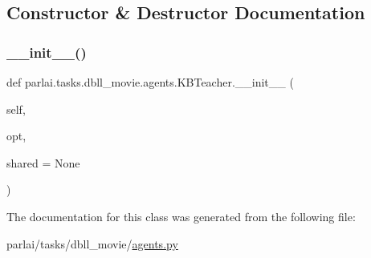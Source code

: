 \subsection{Constructor \& Destructor Documentation}
\mbox{\label{classparlai_1_1tasks_1_1dbll__movie_1_1agents_1_1KBTeacher_a073db440502a585121d5207fc9d9f992}} 
\subsubsection{\texorpdfstring{\+\_\+\+\_\+init\+\_\+\+\_\+()}{\_\_init\_\_()}}
{\footnotesize\ttfamily def parlai.\+tasks.\+dbll\+\_\+movie.\+agents.\+K\+B\+Teacher.\+\_\+\+\_\+init\+\_\+\+\_\+ (\begin{DoxyParamCaption}\item[{}]{self,  }\item[{}]{opt,  }\item[{}]{shared = {\ttfamily None} }\end{DoxyParamCaption})}



The documentation for this class was generated from the following file\+:\begin{DoxyCompactItemize}
\item 
parlai/tasks/dbll\+\_\+movie/\hyperlink{parlai_2tasks_2dbll__movie_2agents_8py}{agents.\+py}\end{DoxyCompactItemize}

